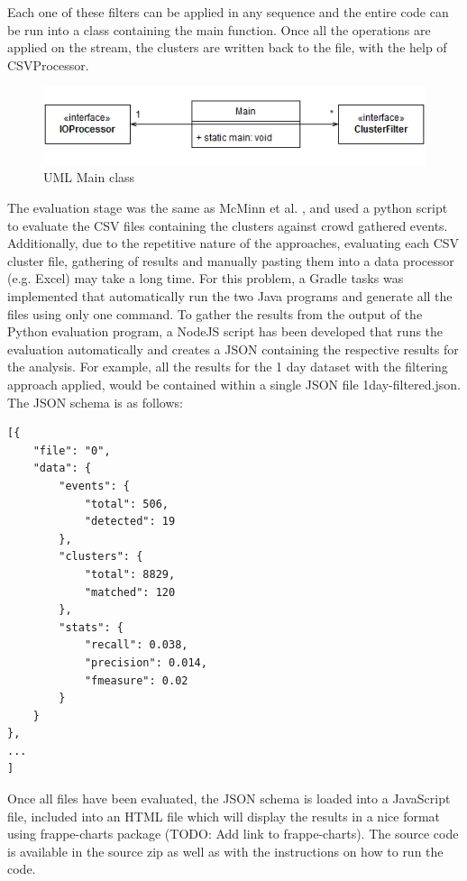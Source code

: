 \documentclass[a4paper,portrait,12pt]{article}
\begin{document}
Each one of these filters can be applied in any sequence and the entire code can be run into a class containing the main function.
Once all the operations are applied on the stream, the clusters are written back to the file, with the help of CSVProcessor.

\begin{figure}[h!]
	\centering
	\includegraphics[width=0.7\linewidth]{images/mainUML.png}
	\caption{UML Main class}
	\label{fig:mainUML}
\end{figure}

The evaluation stage was the same as McMinn et al. \cite{McMinn2013}, and used a python script to evaluate the CSV files containing the clusters against crowd gathered events.
Additionally, due to the repetitive nature of the approaches, evaluating each CSV cluster file, gathering of results and manually pasting them into a data processor (e.g. Excel) may take a long time.
For this problem, a Gradle tasks was implemented that automatically run the two Java programs and generate all the files using only one command.
To gather the results from the output of the Python evaluation program, a NodeJS script has been developed that runs the evaluation automatically and creates a JSON containing the respective results for the analysis.
For example, all the results for the 1 day dataset with the filtering approach applied, would be contained within a single JSON file 1day-filtered.json.
The JSON schema is as follows:
\begin{lstlisting}[caption=JSON Schema Example, label=json-schema]
[{
    "file": "0",
    "data": {
        "events": {
            "total": 506,
            "detected": 19
        },
        "clusters": {
            "total": 8829,
            "matched": 120
        },
        "stats": {
            "recall": 0.038,
            "precision": 0.014,
            "fmeasure": 0.02
        }
    }
},
...
]
\end{lstlisting}

Once all files have been evaluated, the JSON schema is loaded into a JavaScript file, included into an HTML file which will display the results in a nice format using frappe-charts package (TODO: Add link to frappe-charts).
The source code is available in the source zip as well as with the instructions on how to run the code.
\end{document}
